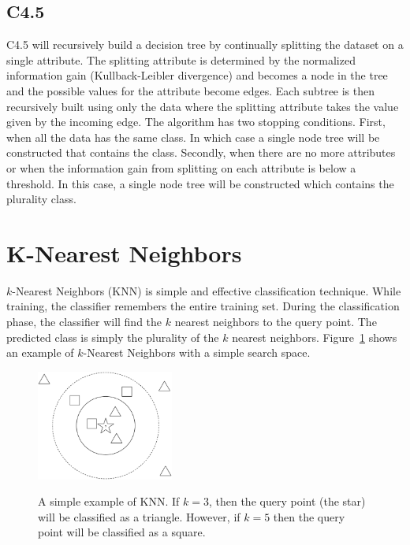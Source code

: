 \documentclass[12pt]{ucthesis}
\newcommand{\captionfonts}{\small\bf\ssp}
\begin{document}
\subsection{C4.5}
\label{background-classification-classifiers-j48-c45}
C4.5 will recursively build a decision tree by continually splitting the dataset on a single attribute\cite{Quinlan}.
The splitting attribute is determined by the normalized information gain (Kullback-Leibler divergence) and becomes a
node in the tree and the possible values for the attribute become edges. Each subtree is then recursively built using only the
data where the splitting attribute takes the value given by the incoming edge. The algorithm has two stopping conditions.
First, when all the data has the same class. In which case a single node tree will be constructed that contains the class.
Secondly, when there are no more attributes or when the information gain from splitting on each attribute is below a threshold.
In this case, a single node tree will be constructed which contains the plurality class.

\section{K-Nearest Neighbors}
\label{background-classification-classifiers-knn}
$k$-Nearest Neighbors (KNN) is simple and effective classification technique\cite{Duda}.
While training, the classifier remembers the entire training set.
During the classification phase, the classifier will find the $k$ nearest neighbors
to the query point. The predicted class is simply the plurality of the $k$ nearest neighbors.
Figure~\ref{fig:knn} shows an example of $k$-Nearest Neighbors with a simple search space.

\begin{figure}
   \begin{center}
      \includegraphics[width=0.4\textwidth]{images/KNN.eps}
      \captionfonts
      \caption[K-Nearest Neighbors]{A simple example of KNN. If $k = 3$, then the query point (the star) will be classified as a triangle. However, if $k = 5$ then the query point will be classified as a square.}
      \label{fig:knn}
   \end{center}
\end{figure}
\end{document}
